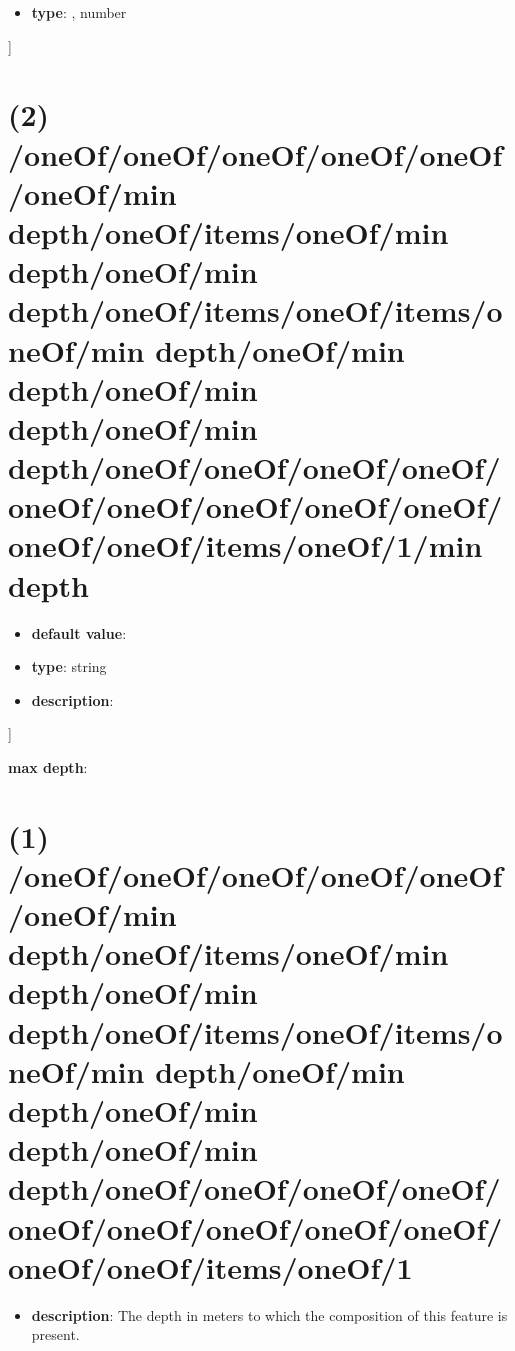 \begin{itemize}[leftmargin=7em]\item {\bf type}: , number\end{itemize}]\section{(2) /oneOf/oneOf/oneOf/oneOf/oneOf/oneOf/min depth/oneOf/items/oneOf/min depth/oneOf/min depth/oneOf/items/oneOf/items/oneOf/min depth/oneOf/min depth/oneOf/min depth/oneOf/min depth/oneOf/oneOf/oneOf/oneOf/oneOf/oneOf/oneOf/oneOf/oneOf/oneOf/oneOf/items/oneOf/1/min depth}
\begin{itemize}[leftmargin=2em]\item {\bf default value}: 
\item {\bf type}: string
\item {\bf description}: 
\end{itemize}]\item {\bf max depth}: \section{(1) /oneOf/oneOf/oneOf/oneOf/oneOf/oneOf/min depth/oneOf/items/oneOf/min depth/oneOf/min depth/oneOf/items/oneOf/items/oneOf/min depth/oneOf/min depth/oneOf/min depth/oneOf/min depth/oneOf/oneOf/oneOf/oneOf/oneOf/oneOf/oneOf/oneOf/oneOf/oneOf/oneOf/items/oneOf/1}
\begin{itemize}[leftmargin=1em]\item {\bf description}: The depth in meters to which the composition of this feature is present.
\end{itemize}
